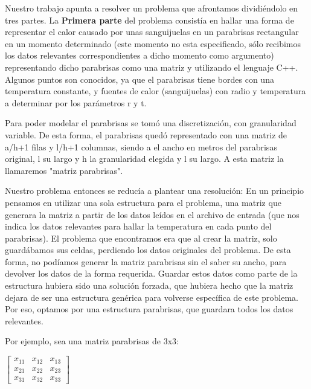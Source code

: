 \documentclass[spanish,a4paper]{article}
\begin{document}
Nuestro trabajo apunta a resolver un problema que afrontamos dividiéndolo en tres partes. \newline \newline
La \textbf{Primera parte} del problema consistía en hallar una forma de representar el calor causado por unas sanguijuelas en un parabrisas rectangular en un momento determinado (este momento no esta especificado, sólo recibimos los datos relevantes correspondientes a dicho momento como argumento) representando dicho parabrisas como una matriz y utilizando el lenguaje C++. Algunos puntos son conocidos, ya que el parabrisas tiene bordes con una temperatura constante, y fuentes de calor (sanguijuelas) con radio y temperatura a determinar por los parámetros r y t.

Para poder modelar el parabrisas se tomó una discretización, con granularidad variable. De esta forma, el parabrisas quedó representado con una matriz de a/h+1 filas y l/h+1 columnas, siendo a el ancho en metros del parabrisas original, l su largo y h la granularidad elegida y l su largo. A esta matriz la llamaremos "matriz parabrisas".

Nuestro problema entonces se reducía a plantear una resolución:
En un principio pensamos en utilizar una sola estructura para el problema, una matriz que generara la matriz a partir de los datos leídos en el archivo de entrada (que nos indica los datos relevantes para hallar la temperatura en cada punto del parabrisas). El problema que encontramos era que al crear la matriz, solo guardábamos sus celdas, perdiendo los datos originales del problema. De esta forma, no podíamos generar la matriz parabrisas sin el saber su ancho, para devolver los datos de la forma requerida. Guardar estos datos como parte de la estructura hubiera sido una solución forzada, que hubiera hecho que la matriz dejara de ser una estructura genérica para volverse específica de este problema. Por eso, optamos por una estructura parabrisas, que guardara todos los datos relevantes.

Por ejemplo, sea una matriz parabrisas de 3x3: \newline \newline

$\begin{bmatrix}x_{11}&x_{12}&x_{13}\\x_{21}&x_{22}&x_{23}\\x_{31}&x_{32}&x_{33}\end{bmatrix}$ \newline \newline
\end{document}

